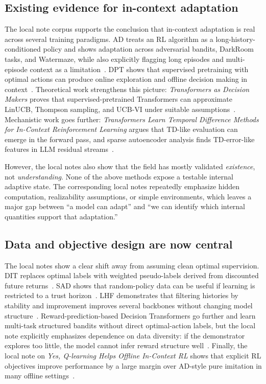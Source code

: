 \documentclass[10pt,twocolumn,letterpaper]{article}
\begin{document}
\subsection{Existing evidence for in-context adaptation}
The local note corpus supports the conclusion that in-context adaptation is real across several training paradigms. AD treats an RL algorithm as a long-history-conditioned policy and shows adaptation across adversarial bandits, DarkRoom tasks, and Watermaze, while also explicitly flagging long episodes and multi-episode context as a limitation~\cite{laskin2022ad}. DPT shows that supervised pretraining with optimal actions can produce online exploration and offline decision making in context~\cite{lee2023dpt}. Theoretical work strengthens this picture: \emph{Transformers as Decision Makers} proves that supervised-pretrained Transformers can approximate LinUCB, Thompson sampling, and UCB-VI under suitable assumptions~\cite{lin2023decisionmakers}. Mechanistic work goes further: \emph{Transformers Learn Temporal Difference Methods for In-Context Reinforcement Learning} argues that TD-like evaluation can emerge in the forward pass, and sparse autoencoder analysis finds TD-error-like features in LLM residual streams~\cite{wang2024td,demircan2024sae}.

However, the local notes also show that the field has mostly validated \emph{existence}, not \emph{understanding}. None of the above methods expose a testable internal adaptive state. The corresponding local notes repeatedly emphasize hidden computation, realizability assumptions, or simple environments, which leaves a major gap between ``a model can adapt'' and ``we can identify which internal quantities support that adaptation.''

\subsection{Data and objective design are now central}
The local notes show a clear shift away from assuming clean optimal supervision. DIT replaces optimal labels with weighted pseudo-labels derived from discounted future returns~\cite{dong2024dit}. SAD shows that random-policy data can be useful if learning is restricted to a trust horizon~\cite{dong2024sad}. LHF demonstrates that filtering histories by stability and improvement improves several backbones without changing model structure~\cite{chen2025lhf}. Reward-prediction-based Decision Transformers go further and learn multi-task structured bandits without direct optimal-action labels, but the local note explicitly emphasizes dependence on data diversity: if the demonstrator explores too little, the model cannot infer reward structure well~\cite{mukherjee2024rewardpredictiondt}. Finally, the local note on \emph{Yes, Q-learning Helps Offline In-Context RL} shows that explicit RL objectives improve performance by a large margin over AD-style pure imitation in many offline settings~\cite{tarasov2025qlearning}.
\end{document}
